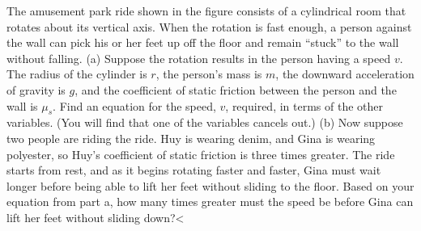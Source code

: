   The amusement park ride shown in the figure consists
of a cylindrical room that rotates about its vertical axis.
When the rotation is fast enough, a person against the wall
can pick his or her feet up off the floor and remain
``stuck'' to the wall without falling.\hwendpart
(a) Suppose the rotation results in the person having a
speed $v$. The radius of the cylinder is $r$, the person's
mass is $m$, the downward acceleration of gravity is $g$,
and the coefficient of static friction between the person
and the wall is $\mu_s$.  Find an equation for the speed,
$v$, required, in terms of the other variables.  (You will
find that one of the variables cancels out.)\hwendpart
(b) Now suppose two people are riding the ride.  Huy is
wearing denim, and Gina is wearing polyester, so Huy's
coefficient of static friction is three times greater.  The
ride starts from rest, and as it begins rotating faster and
faster, Gina must wait longer before being able to lift her
feet without sliding to the floor.  Based on your equation
from part a, how many times greater must the speed be before
Gina can lift her feet without sliding down?<%
